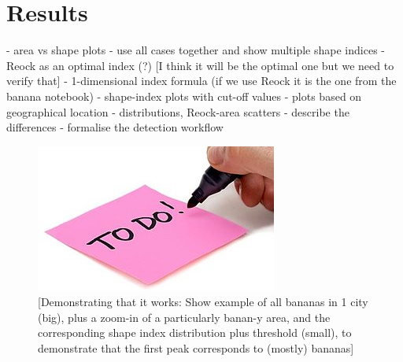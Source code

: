 \section{Results}
\label{sec:results}

- area vs shape plots
    - use all cases together and show multiple shape indices
- Reock as an optimal index (?) [I think it will be the optimal one but we need to verify that]
- 1-dimensional index formula (if we use Reock it is the one from the banana notebook)
- shape-index plots with cut-off values
- plots based on geographical location
    - distributions, Reock-area scatters
    - describe the differences
- formalise the detection workflow

\begin{figure}
    \centering
    \includegraphics{figures/todop}
    \caption{[Demonstrating that it works: Show example of all bananas in 1 city (big), plus a zoom-in of a particularly banan-y area, and the corresponding shape index distribution plus threshold (small), to demonstrate that the first peak corresponds to (mostly) bananas]}
    \label{fig:city}
\end{figure}